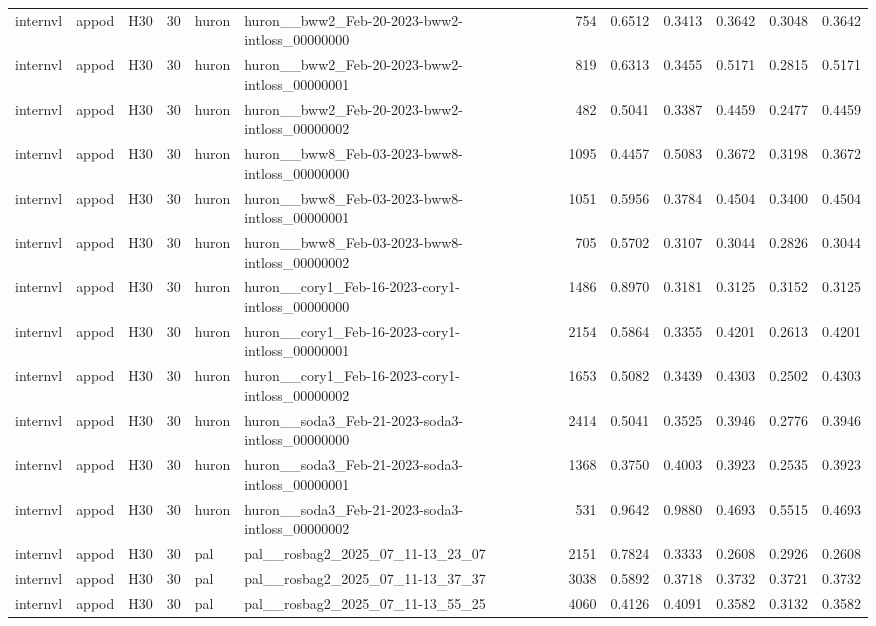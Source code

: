 \begin{table}[tbp]
\begin{tabular}{lllrllrrrrrr}
internvl & appod & H30 & 30 & huron & huron\_\_bww2\_Feb-20-2023-bww2-intloss\_00000000 & 754 & 0.6512 & 0.3413 & 0.3642 & 0.3048 & 0.3642 \\
internvl & appod & H30 & 30 & huron & huron\_\_bww2\_Feb-20-2023-bww2-intloss\_00000001 & 819 & 0.6313 & 0.3455 & 0.5171 & 0.2815 & 0.5171 \\
internvl & appod & H30 & 30 & huron & huron\_\_bww2\_Feb-20-2023-bww2-intloss\_00000002 & 482 & 0.5041 & 0.3387 & 0.4459 & 0.2477 & 0.4459 \\
internvl & appod & H30 & 30 & huron & huron\_\_bww8\_Feb-03-2023-bww8-intloss\_00000000 & 1095 & 0.4457 & 0.5083 & 0.3672 & 0.3198 & 0.3672 \\
internvl & appod & H30 & 30 & huron & huron\_\_bww8\_Feb-03-2023-bww8-intloss\_00000001 & 1051 & 0.5956 & 0.3784 & 0.4504 & 0.3400 & 0.4504 \\
internvl & appod & H30 & 30 & huron & huron\_\_bww8\_Feb-03-2023-bww8-intloss\_00000002 & 705 & 0.5702 & 0.3107 & 0.3044 & 0.2826 & 0.3044 \\
internvl & appod & H30 & 30 & huron & huron\_\_cory1\_Feb-16-2023-cory1-intloss\_00000000 & 1486 & 0.8970 & 0.3181 & 0.3125 & 0.3152 & 0.3125 \\
internvl & appod & H30 & 30 & huron & huron\_\_cory1\_Feb-16-2023-cory1-intloss\_00000001 & 2154 & 0.5864 & 0.3355 & 0.4201 & 0.2613 & 0.4201 \\
internvl & appod & H30 & 30 & huron & huron\_\_cory1\_Feb-16-2023-cory1-intloss\_00000002 & 1653 & 0.5082 & 0.3439 & 0.4303 & 0.2502 & 0.4303 \\
internvl & appod & H30 & 30 & huron & huron\_\_soda3\_Feb-21-2023-soda3-intloss\_00000000 & 2414 & 0.5041 & 0.3525 & 0.3946 & 0.2776 & 0.3946 \\
internvl & appod & H30 & 30 & huron & huron\_\_soda3\_Feb-21-2023-soda3-intloss\_00000001 & 1368 & 0.3750 & 0.4003 & 0.3923 & 0.2535 & 0.3923 \\
internvl & appod & H30 & 30 & huron & huron\_\_soda3\_Feb-21-2023-soda3-intloss\_00000002 & 531 & 0.9642 & 0.9880 & 0.4693 & 0.5515 & 0.4693 \\
internvl & appod & H30 & 30 & pal & pal\_\_rosbag2\_2025\_07\_11-13\_23\_07 & 2151 & 0.7824 & 0.3333 & 0.2608 & 0.2926 & 0.2608 \\
internvl & appod & H30 & 30 & pal & pal\_\_rosbag2\_2025\_07\_11-13\_37\_37 & 3038 & 0.5892 & 0.3718 & 0.3732 & 0.3721 & 0.3732 \\
internvl & appod & H30 & 30 & pal & pal\_\_rosbag2\_2025\_07\_11-13\_55\_25 & 4060 & 0.4126 & 0.4091 & 0.3582 & 0.3132 & 0.3582 \\

\end{tabular}
\end{table}
